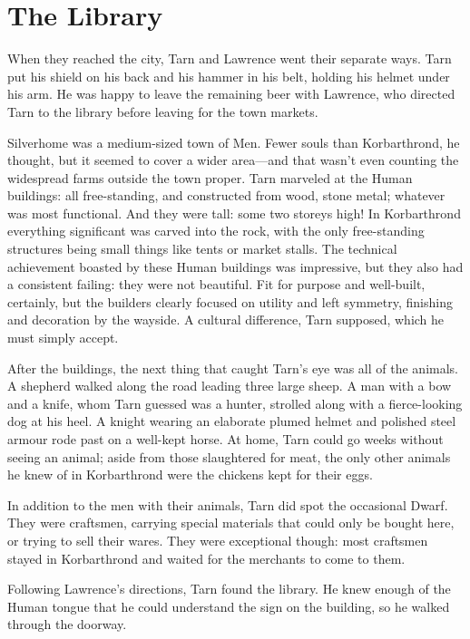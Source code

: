 \chapter{The Library}

When they reached the city, Tarn and Lawrence went their separate ways.  Tarn put his shield on his back and his hammer in his belt, holding his helmet under his arm.  He was happy to leave the remaining beer with Lawrence, who directed Tarn to the library before leaving for the town markets.

Silverhome was a medium-sized town of Men.  Fewer souls than Korbarthrond, he thought, but it seemed to cover a wider area---and that wasn't even counting the widespread farms outside the town proper.  Tarn marveled at the Human buildings: all free-standing, and constructed from wood, stone metal; whatever was most functional.  And they were tall: some two storeys high!  In Korbarthrond everything significant was carved into the rock, with the only free-standing structures being small things like tents or market stalls.  The technical achievement boasted by these Human buildings was impressive, but they also had a consistent failing: they were not beautiful.  Fit for purpose and well-built, certainly, but the builders clearly focused on utility and left symmetry, finishing and decoration by the wayside.  A cultural difference, Tarn supposed, which he must simply accept.

After the buildings, the next thing that caught Tarn's eye was all of the animals.  A shepherd walked along the road leading three large sheep. A man with a bow and a knife, whom Tarn guessed was a hunter, strolled along with a fierce-looking dog at his heel.  A knight wearing an elaborate plumed helmet and polished steel armour rode past on a well-kept horse.  At home, Tarn could go weeks without seeing an animal; aside from those slaughtered for meat, the only other animals he knew of in Korbarthrond were the chickens kept for their eggs.

In addition to the men with their animals, Tarn did spot the occasional Dwarf.  They were craftsmen, carrying special materials that could only be bought here, or trying to sell their wares.  They were exceptional though: most craftsmen stayed in Korbarthrond and waited for the merchants to come to them.

Following Lawrence's directions, Tarn found the library.  He knew enough of the Human tongue that he could understand the sign on the building, so he walked through the doorway.


